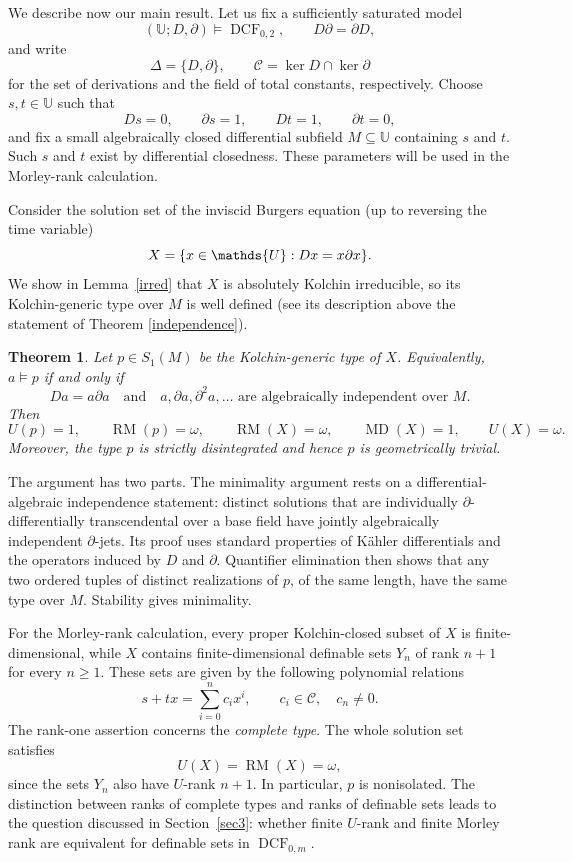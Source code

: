 \documentclass[10pt,a4paper]{amsart}
\newtheorem{theorem}{Theorem}[section]
\newcommand{\DCF}{\operatorname{DCF}}
\newcommand{\RM}{\operatorname{RM}}
\newcommand{\MD}{\operatorname{MD}}
\newcommand{\Ucal}{{\mathds{U}}}
\newcommand{\C}{\mathcal C}
\begin{document}
We describe now our main result. Let us fix a sufficiently
saturated model
\[
 (\Ucal;D,\partial)\models\DCF_{0,2},
 \qquad D\partial=\partial D,
\]
and write
\[
 \Delta=\{D,\partial\},
 \qquad
 \C=\ker D\cap\ker\partial
\]
for the set of derivations and the field of total constants,
respectively. Choose $s,t\in\Ucal$ such that
\[
 Ds=0,\qquad \partial s=1,\qquad
 Dt=1,\qquad \partial t=0,
\]
and fix a small algebraically closed differential subfield
$M\subseteq\Ucal$ containing $s$ and $t$. Such $s$ and $t$ exist by
differential closedness. These parameters will be used in the
Morley-rank calculation.

Consider the solution set of the inviscid Burgers equation (up to reversing the time
variable)
\begin{equation}\label{burgers}
 X=\{x\in\Ucal: Dx=x\partial x\}.
 \notag
\end{equation}
We show in Lemma~\ref{irred} that $X$ is absolutely
Kolchin irreducible, so its Kolchin-generic type over $M$ is
well defined (see its description above the statement of Theorem \ref{independence}).


\begin{theorem}\label{main}
Let $p\in S_1(M)$ be the Kolchin-generic type of $X$. Equivalently,
$a\models p$ if and only if
\[
 Da=a\partial a
 \quad\text{and}\quad
 a,\partial a,\partial^2a,\ldots
 \text{ are algebraically independent over }M.
\]
Then
\[
 U(p)=1,\qquad \RM(p)=\omega, \qquad  \RM(X)=\omega,\qquad \MD(X)=1,\qquad U(X)=\omega.
\]
Moreover, the type $p$ is strictly disintegrated and hence $p$ is geometrically trivial.
\end{theorem}


The argument has two parts. The minimality argument rests on a
differential-algebraic independence statement: distinct solutions
that are individually $\partial$-differentially transcendental over
a base field have jointly algebraically independent
$\partial$-jets. Its proof uses standard properties of K\"ahler
differentials and the operators induced by $D$ and $\partial$.
Quantifier elimination then shows that any two ordered tuples
of distinct realizations of $p$, of the same length, have the
same type over $M$. Stability gives minimality.

For the Morley-rank calculation, every proper Kolchin-closed
subset of $X$ is finite-dimensional, while $X$ contains
finite-dimensional definable sets $Y_n$ of rank $n+1$ for every
$n\geqslant1$. These sets are given by the following polynomial
relations
\[
 s+tx=\sum_{i=0}^{n}c_i x^i,
 \qquad c_i\in\C,\quad c_n\neq0.
\]
The rank-one assertion concerns the \emph{complete type}.
The whole solution set satisfies
\[
 U(X)=\RM(X)=\omega,
\]
since the sets $Y_n$ also have $U$-rank $n+1$. In particular,
$p$ is nonisolated. The distinction between ranks of complete
types and ranks of definable sets leads to the question discussed
in Section~\ref{sec3}: whether finite $U$-rank and finite Morley rank are
equivalent for definable sets in $\DCF_{0,m}$.
\end{document}
